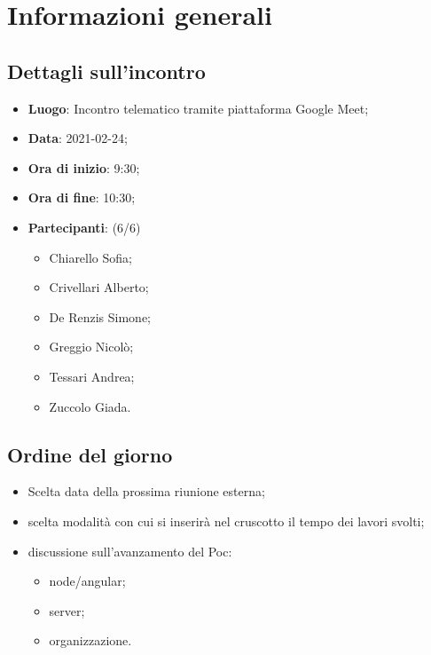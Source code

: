 \section{Informazioni generali}

\subsection{Dettagli sull'incontro}
\begin{itemize}
\item \textbf{Luogo}: Incontro telematico tramite piattaforma Google Meet;
\item \textbf{Data}: 2021-02-24;
\item \textbf{Ora di inizio}: 9:30;
\item \textbf{Ora di fine}: 10:30;
\item \textbf{Partecipanti}: (6/6) 
\begin{itemize}
	\item Chiarello Sofia;
	\item Crivellari Alberto;
	\item De Renzis Simone;
	\item Greggio Nicolò;
	\item Tessari Andrea;
	\item Zuccolo Giada.

\end{itemize}
\end{itemize}

\subsection{Ordine del giorno}
\begin{itemize}
	\item Scelta data della prossima riunione esterna;
	\item scelta modalità con cui si inserirà nel cruscotto il tempo dei lavori svolti;
	\item discussione sull'avanzamento del Poc:
	\begin{itemize}
		\item node/angular;
		\item server;
		\item organizzazione.
	\end{itemize}
	
\end{itemize}


